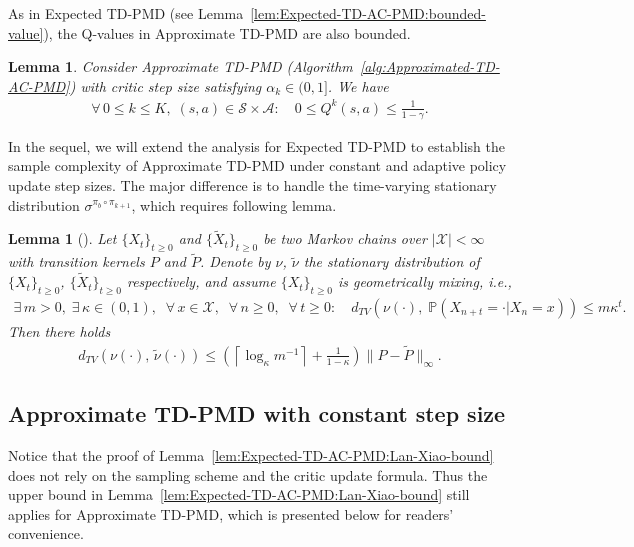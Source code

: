 \documentclass[10pt]{article}
\newcommand{\calA}{\mathcal{A}}
\newcommand{\calS}{\mathcal{S}}
\renewcommand{\P}{\mathbb{P}}
\newcommand{\ls}{\left}
\newcommand{\rs}{\right}
\theoremstyle{plain}
\newtheorem{lemma}[theorem]{Lemma}
\theoremstyle{definition}
\begin{document}
As in Expected TD-PMD (see Lemma~\ref{lem:Expected-TD-AC-PMD:bounded-value}),  the Q-values in Approximate TD-PMD are also bounded.
\begin{lemma}
    Consider Approximate TD-PMD \textup{(}Algorithm~\ref{alg:Approximated-TD-AC-PMD}\textup{)} with critic step size satisfying $\alpha_k \in (0,1]$. We have
    \begin{align*}
        \forall\, 0\leq k\leq K, \; (s,a) \in \calS\times\calA: \quad 0 \leq Q^k(s,a) \leq \frac{1}{1-\gamma}.
    \end{align*}
    \label{lem:Approximated-TD-AC-PMD:bounded-value}
\end{lemma}

In the sequel, we will extend the analysis for Expected TD-PMD to establish the sample complexity of Approximate TD-PMD under constant and adaptive policy update step sizes. The major difference is to handle the time-varying stationary distribution $\sigma^{\pi_b\circ\pi_{k+1}}$, which requires following lemma.

\begin{lemma}[]
    Let $\{ X_t \}_{t\geq0}$ and $\{ \tilde X_t \}_{t\geq0}$ be two Markov chains over $|\mathcal{X}|< \infty$ with transition kernels $P$ and $\tilde P$. Denote by $\nu$, $\tilde\nu$ the stationary distribution of $\{ X_t \}_{t\geq0}$, $\{ \tilde X_t \}_{t\geq0}$ respectively, and assume $\{ X_t \}_{t\geq0}$ is geometrically mixing, i.e.,
    \begin{align*}
        \exists\, m>0, \; \exists\, \kappa \in (0,1), \;\; \forall\, x\in \mathcal{X}, \;\; \forall\, n \geq 0 , \;\; \forall\, t\geq 0: \quad d_{TV} \ls( \nu(\cdot), \; \P(X_{n+t}=\cdot  | X_n = x) \rs) \leq m \kappa^{t}.
    \end{align*}
    Then there holds
    \begin{align*}
        d_{TV}(\nu(\cdot), \, \tilde\nu(\cdot)) \leq \ls( \ls\lceil \log_\kappa m^{-1} \rs\rceil + \frac{1}{1-\kappa} \rs) \| P - \tilde P \|_\infty.
    \end{align*}
    \label{lem:perturbated-chain-stationary-diff}
\end{lemma}


\subsection{Approximate TD-PMD with constant step size}
\label{sec:Approximated-TD-AC-PMD-with-constant-step-size}
Notice that the proof of Lemma~\ref{lem:Expected-TD-AC-PMD:Lan-Xiao-bound} does not rely on the sampling scheme and the critic update formula. Thus the upper bound in Lemma~\ref{lem:Expected-TD-AC-PMD:Lan-Xiao-bound} still applies for Approximate TD-PMD, which is presented below for readers' convenience. 
\end{document}
